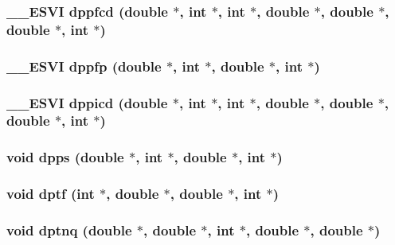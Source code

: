 \subsubsection{\setlength{\rightskip}{0pt plus 5cm}\_\-\_\-ESVI dppfcd (double $\ast$, int $\ast$, int $\ast$, double $\ast$, double $\ast$, double $\ast$, int $\ast$)}\label{essl_8h_a0b17519d087c8b2700133d8ebb18374}


\subsubsection{\setlength{\rightskip}{0pt plus 5cm}\_\-\_\-ESVI dppfp (double $\ast$, int $\ast$, double $\ast$, int $\ast$)}\label{essl_8h_046f885c12e195b9d0935943e0fae814}


\subsubsection{\setlength{\rightskip}{0pt plus 5cm}\_\-\_\-ESVI dppicd (double $\ast$, int $\ast$, int $\ast$, double $\ast$, double $\ast$, double $\ast$, int $\ast$)}\label{essl_8h_8a9a11e5142eeac18fd33d477bda1455}


\subsubsection{\setlength{\rightskip}{0pt plus 5cm}void dpps (double $\ast$, int $\ast$, double $\ast$, int $\ast$)}\label{essl_8h_f4bf63ecc75b3da966acce81614425b2}


\subsubsection{\setlength{\rightskip}{0pt plus 5cm}void dptf (int $\ast$, double $\ast$, double $\ast$, int $\ast$)}\label{essl_8h_d57241581a312dc4f82e4eac01913899}


\subsubsection{\setlength{\rightskip}{0pt plus 5cm}void dptnq (double $\ast$, double $\ast$, int $\ast$, double $\ast$, double $\ast$)}\label{essl_8h_c2216de532a0cb6f8166810c8ecb6070}


